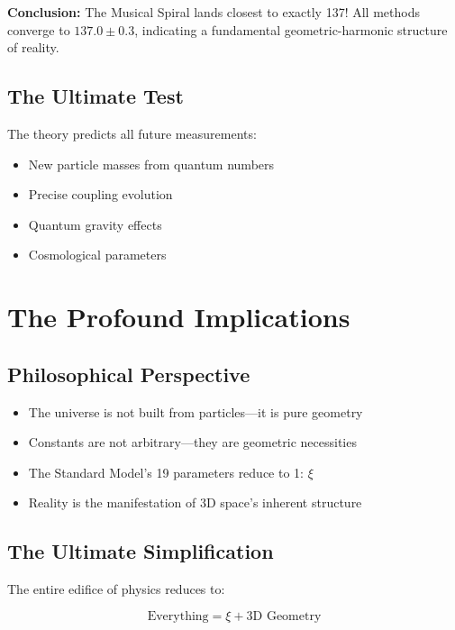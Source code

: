 \documentclass[12pt,a4paper]{article}
\theoremstyle{definition}
\begin{document}
	\textbf{Conclusion:} The Musical Spiral lands closest to exactly 137! All methods converge to $137.0 \pm 0.3$, indicating a fundamental geometric-harmonic structure of reality.
	
	\subsection{The Ultimate Test}
	
	The theory predicts all future measurements:
	\begin{itemize}
		\item New particle masses from quantum numbers
		\item Precise coupling evolution
		\item Quantum gravity effects
		\item Cosmological parameters
	\end{itemize}
	
	\section{The Profound Implications}
	
	\subsection{Philosophical Perspective}
	
	\begin{newperspective}
		\begin{itemize}
			\item The universe is not built from particles---it is pure geometry
			\item Constants are not arbitrary---they are geometric necessities
			\item The Standard Model's 19 parameters reduce to 1: $\xi$
			\item Reality is the manifestation of 3D space's inherent structure
		\end{itemize}
	\end{newperspective}
	
	\subsection{The Ultimate Simplification}
	
	The entire edifice of physics reduces to:
	
	\begin{equation}
		\boxed{\text{Everything} = \xi + \text{3D Geometry}}
	\end{equation}
	
\end{document}
